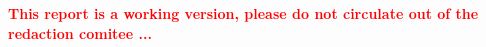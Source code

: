 \documentclass[12pt]{article}
\begin{document}
\maketitle

\textcolor{red}{\textbf{This report is a working version, please do not circulate out of the redaction comitee  ...}} \\
























\end{document}
